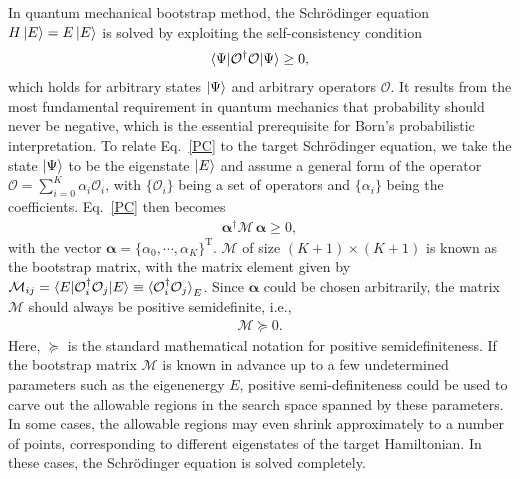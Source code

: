 \documentclass[aps,prc,reprint,superscriptaddress,nofootinbib]{revtex4-2}
\begin{document}
In quantum mechanical bootstrap method, 
 the Schr\"odinger equation
$H\ket{E}=E\ket{E}$
is solved by
exploiting the self-consistency condition
\begin{align}
\braket{\Psi|\mathcal{O}^\dagger\mathcal{O}|\Psi}\geq 0,
\label{PC}
\end{align}
which holds for arbitrary states $\ket{\Psi}$
and arbitrary operators $\mathcal{O}$.
It results from the most fundamental requirement in quantum mechanics
that probability should never be negative, which is the essential prerequisite for Born's probabilistic interpretation.
To relate Eq.~\eqref{PC} to the target Schr\"odinger equation,
we take the state $\ket{\Psi}$ to be the eigenstate $\ket{E}$
and assume a general form of the operator 
$\mathcal{O}=\sum_{i=0}^K \alpha_i \mathcal{O}_i$,
with $\{\mathcal{O}_i\}$ being a set of operators
and $\{\alpha_i\}$ being the coefficients.
Eq.~\eqref{PC} then becomes
\begin{align}
\bm{\alpha}^\dagger\bm{\mathcal{M}}\,\bm{\alpha}\geq0,
\label{PC2}
\end{align}
with the vector $\bm{\alpha}=\{\alpha_0,\cdots,\alpha_K\}^\text{T}$.
$\bm{\mathcal{M}}$ of size $(K+1)\times(K+1)$ is known as the bootstrap matrix, with the matrix element given by $\mathcal{M}_{ij}=\braket{E|\mathcal{O}_i^\dagger\mathcal{O}_j|E}\equiv\braket{\mathcal{O}_i^\dagger\mathcal{O}_j}_E$.
Since $\bm{\alpha}$ could be chosen arbitrarily, 
the matrix $\bm{\mathcal{M}}$ should always be positive semidefinite, i.e.,
\begin{align}
\bm{\mathcal{M}}\succeq0.
\end{align}
Here, $\succeq$ is the standard mathematical notation for positive semidefiniteness.
If the bootstrap matrix $\bm{\mathcal{M}}$ is known in advance up to a few undetermined parameters such as the eigenenergy $E$, positive semi-definiteness could be used to carve out the allowable regions in the search space spanned by these parameters.
In some cases, the allowable regions may even shrink approximately to a number of points,
corresponding to different eigenstates of the target Hamiltonian.
In these cases, the Schr\"odinger equation is solved completely.
\end{document}
